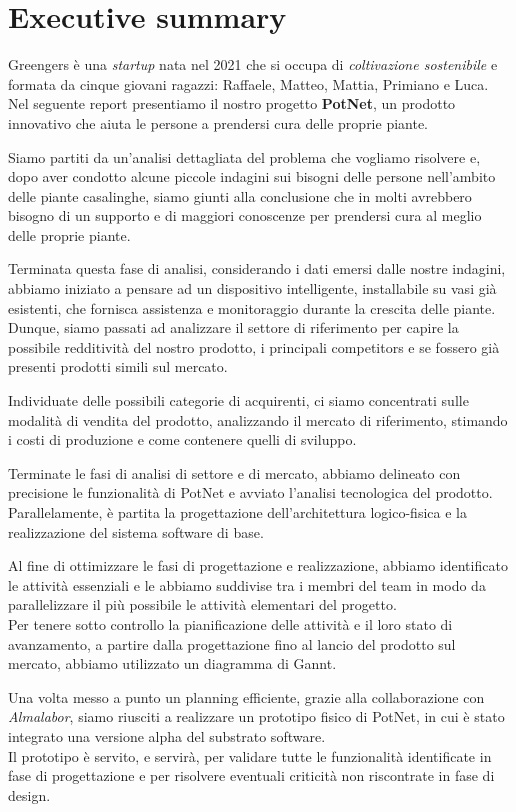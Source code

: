 \section{Executive summary}

Greengers è una \textit{startup} nata nel 2021 che si occupa di \textit{coltivazione sostenibile} e formata da cinque giovani ragazzi: Raffaele, Matteo, Mattia, Primiano e Luca. Nel seguente report presentiamo il nostro progetto \textbf{PotNet}, un prodotto innovativo che aiuta le persone a prendersi cura delle proprie piante.

Siamo partiti da un'analisi dettagliata del problema che vogliamo risolvere e, dopo aver condotto alcune piccole indagini sui bisogni delle persone nell'ambito delle piante casalinghe, siamo giunti alla conclusione che in molti avrebbero bisogno di un supporto e di maggiori conoscenze per prendersi cura al meglio delle proprie piante.

Terminata questa fase di analisi, considerando i dati emersi dalle nostre indagini, abbiamo iniziato a pensare ad un dispositivo intelligente, installabile su vasi già esistenti, che fornisca assistenza e monitoraggio durante la crescita delle piante.\\Dunque, siamo passati ad analizzare il settore di riferimento per capire la possibile redditività del nostro prodotto, i principali competitors e se fossero già presenti prodotti simili sul mercato.

Individuate delle possibili categorie di acquirenti, ci siamo concentrati sulle modalità di vendita del prodotto, analizzando il mercato di riferimento, stimando i costi di produzione e come contenere quelli di sviluppo. 

Terminate le fasi di analisi di settore e di mercato, abbiamo delineato con precisione le funzionalità di PotNet e avviato l'analisi tecnologica del prodotto. Parallelamente, è partita la progettazione dell'architettura logico-fisica e la realizzazione del sistema software di base.

Al fine di ottimizzare le fasi di progettazione e realizzazione, abbiamo identificato le attività essenziali e le abbiamo suddivise tra i membri del team in modo da parallelizzare il più possibile le attività elementari del progetto.\\Per tenere sotto controllo la pianificazione delle attività e il loro stato di avanzamento, a partire dalla progettazione fino al lancio del prodotto sul mercato, abbiamo utilizzato un diagramma di Gannt. 

Una volta messo a punto un planning efficiente, grazie alla collaborazione con \textit{Almalabor}, siamo riusciti a realizzare un prototipo fisico di PotNet, in cui è stato integrato una versione alpha del substrato software.\\Il prototipo è servito, e servirà, per validare tutte le funzionalità identificate in fase di progettazione e per risolvere eventuali criticità non riscontrate in fase di design.